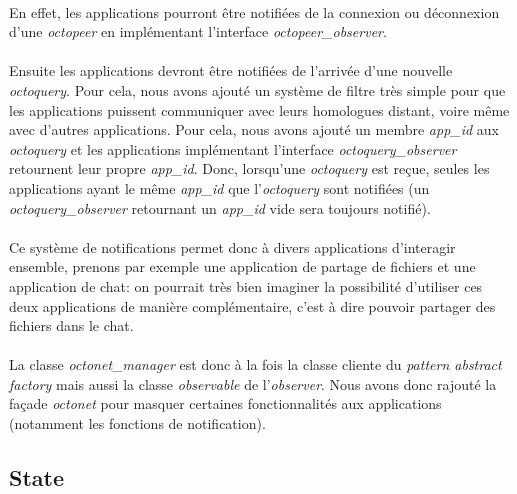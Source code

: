 \documentclass[a4paper]{article}
\begin{document}
			\paragraph{}{
			En effet, les applications pourront être notifiées de la connexion ou déconnexion d’une
			\textit{octopeer} en implémentant l’interface \textit{octopeer\_observer}.
			}
			\paragraph{}{
			Ensuite les applications devront être notifiées de l’arrivée d’une nouvelle \textit{octoquery}. 
			Pour cela, nous avons ajouté un système de filtre très simple pour que les applications 
			puissent communiquer avec leurs homologues distant, voire même avec d’autres applications. \newline
			Pour cela, nous avons ajouté un membre \textit{app\_id} aux \textit{octoquery} et les applications implémentant 
			l’interface \textit{octoquery\_observer} retournent leur propre \textit{app\_id}. 
			Donc, lorsqu’une \textit{octoquery} est reçue, seules les applications ayant le même 
			\textit{app\_id} que l’\textit{octoquery} sont notifiées (un \textit{octoquery\_observer} retournant 
			un \textit{app\_id} vide sera toujours notifié).
			}

			\paragraph{}{
			Ce système de notifications permet donc à divers applications d’interagir ensemble, prenons par 
			exemple une application de partage de fichiers et une application de chat: on pourrait très bien 
			imaginer la possibilité d’utiliser ces deux applications de manière complémentaire, c’est à dire 
			pouvoir partager des fichiers dans le chat.
			}
			
			\paragraph{}{
			La classe \textit{octonet\_manager} est donc à la fois la classe cliente du \textit{pattern abstract factory} 
			mais aussi la classe \textit{observable} de l'\textit{observer}. Nous avons donc rajouté la façade 
			\textit{octonet} pour masquer certaines fonctionnalités aux applications (notamment les fonctions 
			de notification).
			}
		
		\subsection{State}
		
\end{document}
